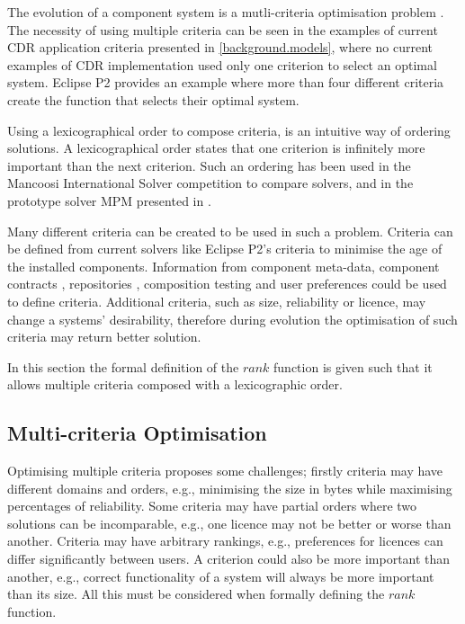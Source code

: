 The evolution of a component system is a mutli-criteria optimisation problem \citep{Berre2008}.
The necessity of using multiple criteria can be seen in the examples of current CDR application criteria presented in \ref{background.models},
where no current examples of CDR implementation used only one criterion to select an optimal system.
Eclipse P2 provides an example where more than four different criteria create the function that selects their optimal system.

Using a lexicographical order to compose criteria, is an intuitive way of ordering solutions.
A lexicographical order states that one criterion is infinitely more important than the next criterion.
Such an ordering has been used in the Mancoosi International Solver competition to compare solvers, and in the prototype solver MPM presented in \citep{abate2011}.

Many different criteria can be created to be used in such a problem.
Criteria can be defined from current solvers like Eclipse P2's criteria to minimise the age of the installed components.
Information from component meta-data, component contracts \citep{Watkins1999}, repositories \citep{Guo2000}, 
composition testing \citep{XuejieZhang2008} and user preferences could be used to define criteria.
Additional criteria, such as size, reliability or licence, may change a systems' desirability, 
therefore during evolution the optimisation of such criteria may return better solution.

In this section the formal definition of the $rank$ function is given such that it allows multiple criteria composed with a lexicographic order.

\subsection{Multi-criteria Optimisation}
Optimising multiple criteria proposes some challenges; firstly criteria may have different domains and orders, 
e.g., minimising the size in bytes while maximising percentages of reliability. 
Some criteria may have partial orders where two solutions can be incomparable,
e.g., one licence may not be better or worse than another.
Criteria may have arbitrary rankings, 
e.g., preferences for licences can differ significantly between users.
A criterion could also be more important than another, 
e.g., correct functionality of a system will always be more important than its size.
All this must be considered when formally defining the $rank$ function.

